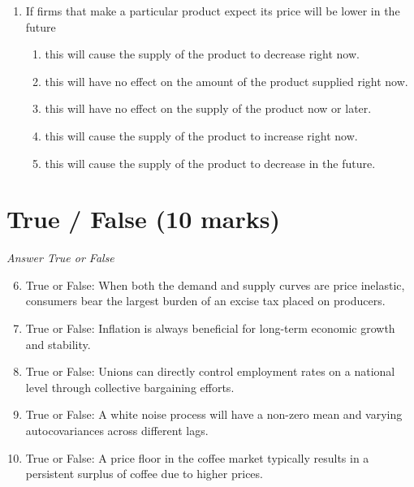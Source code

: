 \documentclass[12pt]{article}
\begin{document}
\begin{enumerate}[label=\arabic*.]
\begin{enumerate}[label=(\alph*)]
    \item A decrease in both supply and demand and an ambiguous change in interest rates.
    \item An increase in supply lowering the interest rate.
    \item A decrease in demand increasing the interest rate.
    \item An increase in demand increasing the interest rate.
    \item A decrease in supply increasing the interest rate.
\end{enumerate}
\item If firms that make a particular product expect its price will be lower in the future
\begin{enumerate}[label=(\alph*)]
    \item this will cause the supply of the product to decrease right now.
    \item this will have no effect on the amount of the product supplied right now.
    \item this will have no effect on the supply of the product now or later.
    \item this will cause the supply of the product to increase right now.
    \item this will cause the supply of the product to decrease in the future.
\end{enumerate}
\end{enumerate}

\section*{True / False (10 marks)}
\textit{Answer True or False}
\begin{enumerate}[label=\arabic*.]
\setcounter{enumi}{5}
\item True or False: When both the demand and supply curves are price inelastic, consumers bear the largest burden of an excise tax placed on producers.
\item True or False: Inflation is always beneficial for long-term economic growth and stability.
\item True or False: Unions can directly control employment rates on a national level through collective bargaining efforts.
\item True or False: A white noise process will have a non-zero mean and varying autocovariances across different lags.
\item True or False: A price floor in the coffee market typically results in a persistent surplus of coffee due to higher prices.
\end{enumerate}
\end{document}
